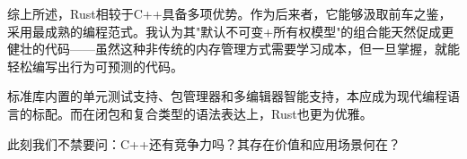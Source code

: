 综上所述，Rust相较于C++具备多项优势。作为后来者，它能够汲取前车之鉴，采用最成熟的编程范式。我认为其"默认不可变+所有权模型"的组合能天然促成更健壮的代码——虽然这种非传统的内存管理方式需要学习成本，但一旦掌握，就能轻松编写出行为可预测的代码。

标准库内置的单元测试支持、包管理器和多编辑器智能支持，本应成为现代编程语言的标配。而在闭包和复合类型的语法表达上，Rust也更为优雅。

此刻我们不禁要问：C++还有竞争力吗？其存在价值和应用场景何在？